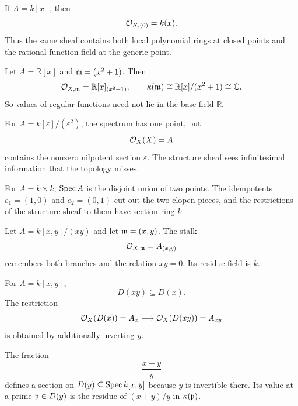 \begin{example}
If $A=k[x]$, then
\[
\mathcal O_{X,(0)}=k(x).
\]
Thus the same sheaf contains both local polynomial rings at closed points and the rational-function field at the generic point.
\end{example}

\begin{example}
Let $A=\mathbb R[x]$ and $\mathfrak m=(x^2+1)$.  Then
\[
\mathcal O_{X,\mathfrak m}=\mathbb R[x]_{(x^2+1)},
\qquad
\kappa(\mathfrak m)\cong\mathbb R[x]/(x^2+1)\cong\mathbb C.
\]
So values of regular functions need not lie in the base field $\mathbb R$.
\end{example}

\begin{example}
For $A=k[\varepsilon]/(\varepsilon^2)$, the spectrum has one point, but
\[
\mathcal O_X(X)=A
\]
contains the nonzero nilpotent section $\varepsilon$.  The structure sheaf sees infinitesimal information that the topology misses.
\end{example}

\begin{example}
For $A=k\times k$, $\operatorname{Spec} A$ is the disjoint union of two points.  The idempotents
$e_1=(1,0)$ and $e_2=(0,1)$ cut out the two clopen pieces, and the restrictions of the structure sheaf to them have section ring $k$.
\end{example}

\begin{example}[The crossing $xy=0$]
Let $A=k[x,y]/(xy)$ and let $\mathfrak m=(x,y)$.  The stalk
\[
\mathcal O_{X,\mathfrak m}=A_{(x,y)}
\]
remembers both branches and the relation $xy=0$.  Its residue field is $k$.
\end{example}

\begin{example}
For $A=k[x,y]$,
\[
D(xy)\subseteq D(x).
\]
The restriction
\[
\mathcal O_X(D(x))=A_x\longrightarrow\mathcal O_X(D(xy))=A_{xy}
\]
is obtained by additionally inverting $y$.
\end{example}

\begin{example}
The fraction
\[
\frac{x+y}{y}
\]
defines a section on $D(y)\subseteq\operatorname{Spec} k[x,y]$ because $y$ is invertible there.  Its value at a prime $\mathfrak p\in D(y)$ is the residue of $(x+y)/y$ in $\kappa(\mathfrak p)$.
\end{example}

